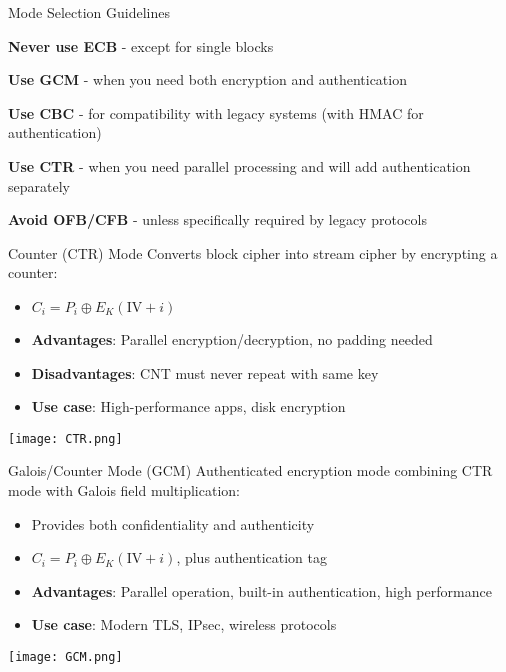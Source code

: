 \begin{KR}{Mode Selection Guidelines}

    \textbf{Never use ECB} - except for single blocks

    \textbf{Use GCM} - when you need both encryption and authentication

    \textbf{Use CBC} - for compatibility with legacy systems (with HMAC for authentication)

    \textbf{Use CTR} - when you need parallel processing and will add authentication separately

    \textbf{Avoid OFB/CFB} - unless specifically required by legacy protocols

\end{KR}


\multend


\begin{definition}{Counter (CTR) Mode}
Converts block cipher into stream cipher by encrypting a counter:
\begin{itemize}
    \item \normalsize $C_i = P_i \oplus E_K(\text{IV} + i)$ \small
    \item \textbf{Advantages}: Parallel encryption/decryption, no padding needed
    \item \textbf{Disadvantages}: CNT must never repeat with same key
    \item \textbf{Use case}: High-performance apps, disk encryption
\end{itemize}
\texttt{[image: CTR.png]}
\end{definition}



\begin{definition}{Galois/Counter Mode (GCM)}
Authenticated encryption mode combining CTR mode with Galois field multiplication:
\begin{itemize}
    \item Provides both confidentiality and authenticity
    \item \normalsize $C_i = P_i \oplus E_K(\text{IV} + i)$, plus authentication tag \small
    \item \textbf{Advantages}: Parallel operation, built-in authentication, high performance
    \item \textbf{Use case}: Modern TLS, IPsec, wireless protocols
\end{itemize}
\texttt{[image: GCM.png]}
\end{definition}

